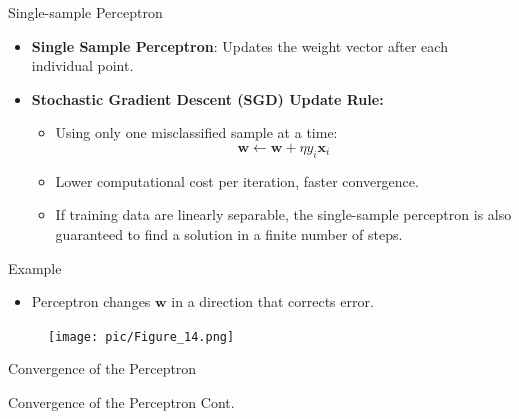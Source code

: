 \documentclass[serif, aspectratio=169]{beamer}
\begin{document}
\begin{frame}{Single-sample Perceptron}
    \begin{itemize}\itemsep1.5em
        \item \justifying \textbf{Single Sample Perceptron}: Updates the weight vector after each individual point.
        \item \textbf{Stochastic Gradient Descent (SGD) Update Rule:}
        \smallskip
        \begin{itemize}\itemsep1em
            \item Using only one misclassified sample at a time:
            \[
            \mathbf{w} \leftarrow \mathbf{w} + \eta y_i \mathbf{x}_i
            \]
            \item Lower computational cost per iteration, faster convergence.
            \item \justifying If training data are linearly separable, the single-sample perceptron is also guaranteed to find a solution in a finite number of steps.
        \end{itemize}
    \end{itemize}
\end{frame}

\begin{frame}{Example}
    \begin{itemize}
        \item Perceptron changes \(\mathbf{w}\) in a direction that corrects error.
    \end{itemize}
    \begin{figure}
        \centering
        \texttt{[image: pic/Figure\_14.png]}
    \end{figure}
    \vfill
\end{frame}

\begin{frame}{Convergence of the Perceptron}
    
\end{frame}

\begin{frame}{Convergence of the Perceptron Cont.}
    
\end{frame}
\end{document}

